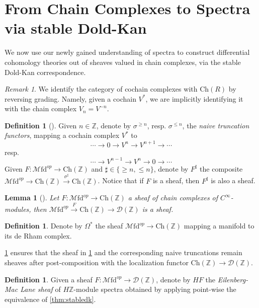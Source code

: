 \documentclass[10pt]{amsart}
\newcommand{\D}{\mathscr{D}}
\newcommand{\bZ}{\mathbb{Z}}
\newcommand{\Ch}{\mathrm{Ch}}
\newcommand{\Mfd}{\mathscr{M}\mathrm{fd}}
\newtheorem{lemma}[equation]{Lemma}
\theoremstyle{definition}
\newtheorem{definition}[equation]{Definition}
\theoremstyle{remark}
\newtheorem{remark}[equation]{Remark}
\numberwithin{equation}{section}
\begin{document}
\section{From Chain Complexes to Spectra via stable Dold-Kan}
We now use our newly gained understanding of spectra to construct differential cohomology theories out of sheaves valued in chain complexes, via the stable Dold-Kan correspondence.
\begin{remark}\label{rmk:identification}
  We identify the category of cochain complexes with $\Ch(R)$ by reversing grading. Namely, given a cochain $V^*$, we are implicitly identifying it with the chain complex $V_n=V^{-n}$. 
\end{remark}
\begin{definition}[{\cite[Definition 7.14]{bunkenikolausvoelkl2016diffcoh}}]Given $n\in\bZ$, denote by $\sigma^{\geq n}$, resp. $\sigma^{\leq n}$, the \emph{naive truncation functors}, mapping a cochain complex $V^*$ to \[\cdots\to0\to V^n\to V^{n+1}\to\cdots\]
  resp. \[\cdots\to V^{n-1}\to V^n\to0\to\cdots\]Given $F:\Mfd^{op}\to\Ch(\bZ)$ and $\sharp\in\{\geq n,\leq n\}$, denote by $F^\sharp$ the composite $\Mfd^{op}\to\Ch(\bZ)\xrightarrow{\sigma^\sharp}\Ch(\bZ)$. Notice that if $F$ is a sheaf, then $F^\sharp$ is also a sheaf.
\end{definition}
\begin{lemma}[{\cite[Lemma 7.12]{bunkenikolausvoelkl2016diffcoh}}]\label{lem:sheafloc}
  Let $F:\Mfd^{op}\to\Ch(\bZ)$ a sheaf of chain complexes of $C^\infty$-modules, then $\Mfd^{op}\xrightarrow{F}\Ch(\bZ)\to\D(\bZ)$ is a sheaf. 
\end{lemma}
\begin{definition}\label{def:forms}
  Denote by $\Omega^*$ the sheaf $\Mfd^{op}\to\Ch(\bZ)$ mapping a manifold to its de Rham complex. 
\end{definition}
\cref{lem:sheafloc} ensures that the sheaf in \cref{def:forms} and the corresponding naive truncations remain sheaves after post-composition with the localization functor $\Ch(\bZ)\to\D(\bZ)$.  
\begin{definition}\label{def:EMsheaf}
  Given a sheaf $F:\Mfd^{op}\to\D(\bZ)$, denote by $HF$ the \emph{Eilenberg-Mac Lane sheaf} of $H\bZ$-module spectra obtained by applying point-wise the equivalence of \cref{thm:stabledk}. 
\end{definition}

\end{document}
